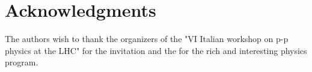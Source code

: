 \documentclass{PoS}
\begin{document}

\section{Acknowledgments}
The authors wish to thank the organizers of the "VI Italian workshop on p-p physics at the LHC" 
for the invitation and the for the rich and interesting physics program.



\end{document}
